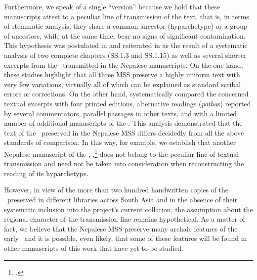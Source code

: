 Furthermore, we speak of a single “version” because we hold that these manuscripts
attest to a peculiar line of transmission of the text, that is, in terms of
stemmatic analysis, they share %
a common ancestor (hyparchetype) or a group of ancestors, while at the same time,
bear no signs of significant contamination. This hypothesis was postulated in
\citet{kleb-2010} and reiterated in \citet{kleb-2021a} as the result of a
systematic analysis of two complete chapters (SS.1.3 and SS.1.15) %
as well as several shorter excerpts from the \SS\ transmitted in the Nepalese
manuscripts. On the one hand, these studies highlight that all three MSS preserve
a highly uniform text with very few variations, virtually all of which can be
explained as standard scribal errors or corrections. On the other hand,
\citet{kleb-2010,kleb-2021a} systematically compared %
the concerned textual excerpts with four printed editions, alternative readings
(\emph{pāṭha}s) reported by several commentators, %
parallel passages in other texts, and with a limited number of additional
manuscripts of the \SS. This analysis demonstrated that the text of the \SS\
preserved in the Nepalese MSS differs decidedly from all the above standards of
comparison. In this way, for example, we establish that another Nepalese
manuscript of the \SS, \MS{Kathmandu NAK 1-1146},\footcite{rima-2022} does not
belong to the peculiar line of textual transmission and need not be taken into
consideration when reconstructing the reading of its hyparchetype. 

However, in view of the more than two hundred handwritten copies of the \SS\ preserved
in different libraries across South Asia and in the absence of their systematic
inclusion into the project's current collation, 
the assumption about the regional character of the transmission line remains
hypothetical. As a matter of fact, we believe that the Nepalese MSS
preserve many archaic features of the early \SS\ and it is possible, even likely, that
some of these features will be found in other manuscripts of this work that have
yet to be studied.%

